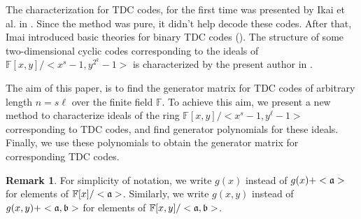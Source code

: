\documentclass{amsart}
\theoremstyle{definition}
\theoremstyle{definitions}
\newtheorem{remark}[theorem]{Remark}
\theoremstyle{notations}
\theoremstyle{note}
\theoremstyle{remarks}
\begin{document}
The characterization for TDC codes, for the first time was presented by Ikai et al. in \cite{ik}. Since the method was pure, it didn't help decode these codes. After that, Imai introduced basic theories for binary TDC codes (\cite{im}). The structure of some two-dimensional cyclic codes corresponding to the ideals of ${\mathbb{F}}[x, y]/<x^s-1,y^{2^k}-1>$ is characterized by the present author in \cite{zahra}.

 The aim of this paper, is to find the generator matrix for TDC codes of arbitrary length $n=s\ell$ over the finite field ${\mathbb{F}}$. To achieve this aim, we present a new method to characterize ideals of the ring ${\mathbb{F}}[x, y]/<x^s-1,y^\ell-1>$ corresponding to TDC codes, and find generator polynomials for these ideals. Finally, we use these polynomials to obtain the generator matrix for corresponding TDC codes.
 

\begin{remark}
For simplicity of notation, we write $g(x)$ instead of $g(x)+<{\frak{a}}>$ for elements of ${\mathbb{F}}[x]/<{\frak{a}}>$. Similarly, we write $g(x,y)$ instead of $g(x,y)+<{\frak{a}},{\frak{b}}>$ for elements of ${\mathbb{F}}[x,y]/<{\frak{a}},{\frak{b}}>$.
\end{remark}
\end{document}
